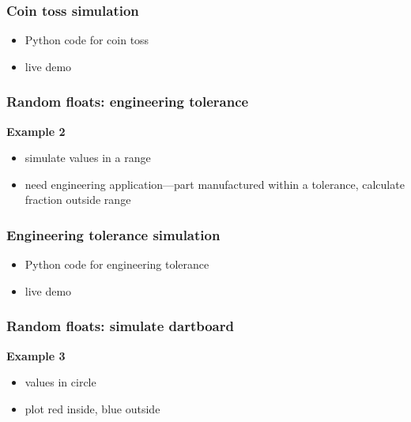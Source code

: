 \documentclass[english,14pt]{beamer}
\begin{document}

\begin{frame}[fragile]

\frametitle{Coin toss simulation}

\begin{itemize}
	\item Python code for coin toss
	\item live demo
\end{itemize}

\end{frame}


\begin{frame}[fragile]

\frametitle{Random floats: engineering tolerance}

\textbf{Example 2}\\
\vspace*{5mm}
\begin{itemize}
	\item simulate values in a range
	\item need engineering application---part manufactured within a tolerance, calculate fraction outside range
\end{itemize}

\end{frame}


\begin{frame}[fragile]

\frametitle{Engineering tolerance simulation}

\begin{itemize}
	\item Python code for engineering tolerance
	\item live demo
\end{itemize}

\end{frame}


\begin{frame}[fragile]

\frametitle{Random floats: simulate dartboard}

\textbf{Example 3}\\
\vspace*{5mm}
\begin{itemize}
	\item values in circle
	\item plot red inside, blue outside
\end{itemize}

\end{frame}
\end{document}
